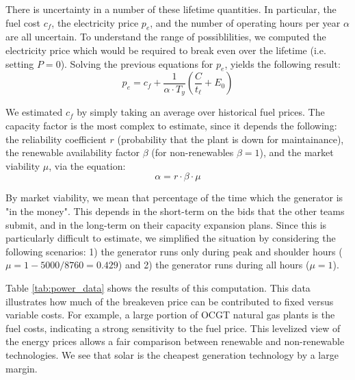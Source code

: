 \documentclass[journal,11pt]{IEEEtran}
\begin{document}
There is uncertainty in a number of these lifetime quantities. In particular, the fuel cost $c_f$, the electricity price $p_e$, and the number of operating hours per year $\alpha$
are all uncertain. To understand the range of possiblilities, we computed the electricity price which would be required to break even over the lifetime (i.e. setting $P=0$). 
Solving the previous equations for $p_e$, yields the following result:
\begin{equation}
  p_e = c_f + \frac{1}{\alpha \cdot T_y} (\frac{C}{t_\ell} + E_0)
\end{equation}

We estimated $c_f$ by simply taking an average over historical fuel prices. The capacity factor is the most complex to estimate, since it depends the following: 
the reliability coefficient $r$ (probability that the plant is down for maintainance), the renewable availability factor $\beta$ (for non-renewables $\beta=1$), and the market viability $\mu$,
via the equation:
\begin{equation}
  \alpha = r \cdot \beta \cdot \mu
\end{equation}

By market viability, we mean that percentage of the time which the generator is "in the money". This depends in the short-term on the bids that the other teams submit, 
and in the long-term on their capacity expansion plans. Since this is particularly difficult to estimate, we simplified the situation by considering the following scenarios:
1) the generator runs only during peak and shoulder hours ($\mu=1-5000/8760=0.429$) and 2) the generator runs during all hours ($\mu=1$).

Table \ref{tab:power_data} shows the results of this computation. This data illustrates how much of the breakeven price can be contributed to fixed versus variable 
costs. For example, a large portion of OCGT natural gas plants is the fuel costs, indicating a strong sensitivity to the fuel price. This levelized view of the energy
prices allows a fair comparison between renewable and non-renewable technologies.  We see that solar is the cheapest generation technology by a large margin.
\end{document}
